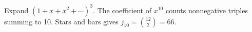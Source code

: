 Expand $(1+x+x^2+\cdots)^3 $. The coefficient of $ x^{10}$ counts nonnegative triples summing to 10. Stars and bars gives $ j_{10}=\binom{12}{2}=\boxed{66}$.
